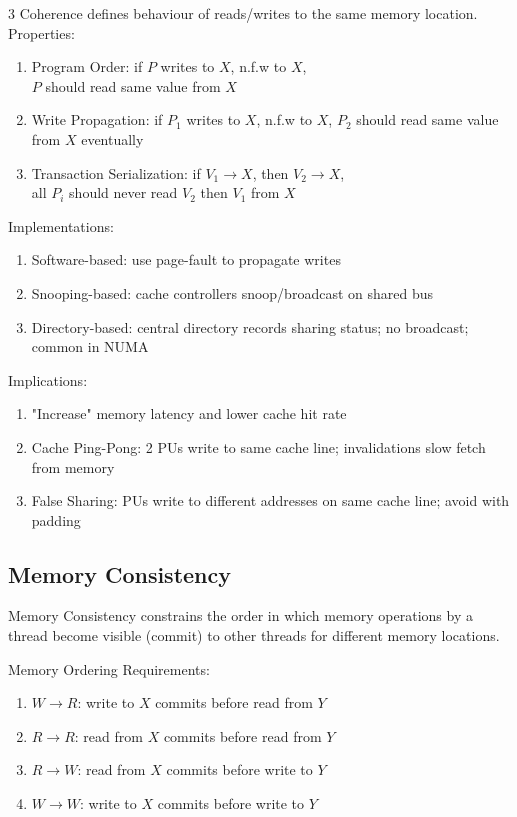 \documentclass[12pt, a4paper]{article}
\begin{document}
\begin{multicols*}{3}
Coherence defines behaviour of reads/writes to the same memory location. Properties:
\begin{enumerate}[\roman*.]
  \item Program Order: if $P$ writes to $X$, n.f.w to $X$,\\$P$ should read same value from $X$ 
  \item Write Propagation: if $P_1$ writes to $X$, n.f.w to $X$, $P_2$ should read same value from $X$ eventually
  \item Transaction Serialization: if $V_1 \rightarrow X$, then $V_2 \rightarrow X$,\\all $P_i$ should never read $V_2$ then $V_1$ from $X$
\end{enumerate}

Implementations: 
\begin{enumerate}[\roman*.]
  \item Software-based: use page-fault to propagate writes
  \item Snooping-based: cache controllers snoop/broadcast on shared bus
  \item Directory-based: central directory records sharing status; no broadcast; common in NUMA
\end{enumerate}

Implications:
\begin{enumerate}[\roman*.]
  \item "Increase" memory latency and lower cache hit rate
  \item Cache Ping-Pong: 2 PUs write to same cache line; invalidations slow fetch from memory
  \item False Sharing: PUs write to different addresses on same cache line; avoid with padding
\end{enumerate}
\vspace{-1em}
\colbreak
\subsection{Memory Consistency}
Memory Consistency constrains the order in which memory operations by a thread become visible (commit) to other threads for different memory locations. 

Memory Ordering Requirements:
\begin{enumerate}[\roman*.]
  \item $W \rightarrow R$: write to $X$ commits before read from $Y$
  \item $R \rightarrow R$: read from $X$ commits before read from $Y$
  \item $R \rightarrow W$: read from $X$ commits before write to $Y$
  \item $W \rightarrow W$: write to $X$ commits before write to $Y$
\end{enumerate}


\end{multicols*}
\end{document}
